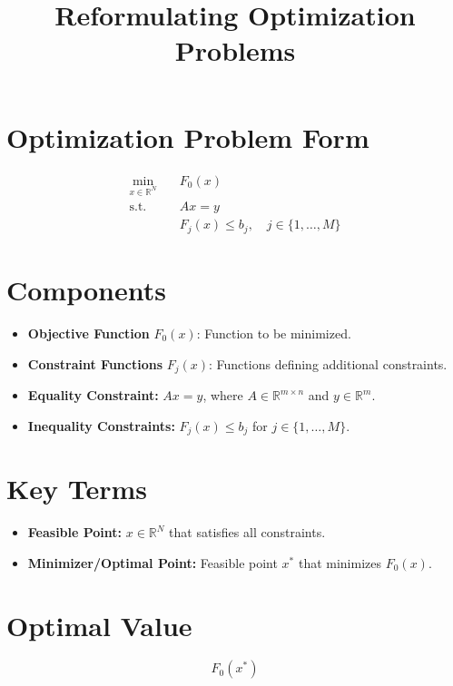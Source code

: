 \documentclass{article}
\begin{document}
\section*{Optimization Problem Form}
\begin{align*}
\min_{x \in \mathbb{R}^N} & \quad F_0(x) \\
\text{s.t.} & \quad Ax = y \\
& \quad F_j(x) \leq b_j, \quad j \in \{1, \ldots, M\}
\end{align*}

\section*{Components}
\begin{itemize}[leftmargin=*]
    \item \textbf{Objective Function} $F_0(x)$: Function to be minimized.
    \item \textbf{Constraint Functions} $F_j(x)$: Functions defining additional constraints.
    \item \textbf{Equality Constraint:} $Ax = y$, where $A \in \mathbb{R}^{m \times n}$ and $y \in \mathbb{R}^m$.
    \item \textbf{Inequality Constraints:} $F_j(x) \leq b_j$ for $j \in \{1, \ldots, M\}$.
\end{itemize}

\section*{Key Terms}
\begin{itemize}[leftmargin=*]
    \item \textbf{Feasible Point:} $x \in \mathbb{R}^N$ that satisfies all constraints.
    \item \textbf{Minimizer/Optimal Point:} Feasible point $x^*$ that minimizes $F_0(x)$.
\end{itemize}

\section*{Optimal Value}
\[
F_0(x^*)
\]









\title{Reformulating Optimization Problems}
\author{}
\date{}


\maketitle
\end{document}
